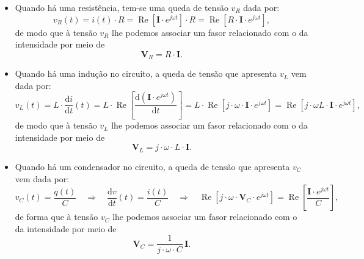 \begin{itemize}
  \item Quando há uma resistência, tem-se uma queda de tensão $v_R$ dada por:
    \[
    v_R(t) = i(t)\cdot  R = \operatorname{Re}\left[\mathbf{I}\cdot e^{j\omega t}\right]\cdot R = \operatorname{Re}\left[R\cdot \mathbf{I}\cdot e^{j\omega t}\right],
    \]
    de modo que à tensão $v_R$ lhe podemos associar um fasor relacionado com o da intensidade por meio de
    \begin{equation}
      \label{eq:FasorVR}
      \mathbf{V}_R = R\cdot \mathbf{I}.
    \end{equation}

  \item Quando há uma indução no circuito, a queda de tensão que apresenta $v_L$ vem dada por:
    \[
    v_L(t) = L \cdot \frac{\text{d}i}{\text{d}t}(t) = L \cdot \operatorname{Re} \left[\frac{\text{d} (\mathbf{I}\cdot e^{j\omega t})}{\text{d}t}\right] = L \cdot  \operatorname{Re} \left[j\cdot \omega\cdot \mathbf{I}\cdot e^{j\omega t}\right] =   \operatorname{Re} \left[j\cdot \omega L\cdot \mathbf{I} \cdot e^{j\omega t}\right],
    \]
    de modo que à tensão $v_L$ lhe podemos associar um fasor relacionado com o da intensidade por meio de
    \begin{equation}
      \label{eq:FasorVL}
      \mathbf{V}_L = j \cdot \omega \cdot L\cdot\mathbf{I}.
    \end{equation}

  \item Quando há um condensador no circuito, a queda de tensão que apresenta $v_C$ vem dada por:
    \[
    v_C(t) = \frac{q(t)}{C} \quad \Longrightarrow \quad  \frac{\text{d}v}{\text{d}t}(t) = \frac{i(t)}{C}  \quad \Longrightarrow \quad \operatorname{Re}\left[j\cdot \omega\cdot \mathbf{V}_C\cdot e^{j\omega t}\right] = \operatorname{Re} \left[\frac{\mathbf{I}\cdot e^{j\omega t}}{C}\right],
    \]
    de forma que à tensão $v_C$ lhe podemos associar um fasor relacionado com o da intensidade por meio de
    \begin{equation}
      \label{eq:FasorVC}
      \mathbf{V}_C = \frac{1}{j\cdot  \omega \cdot C}\,\mathbf{I}.
    \end{equation}
\end{itemize}


